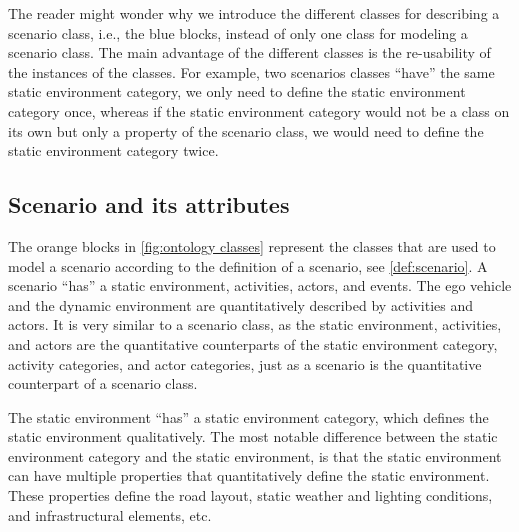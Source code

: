 \cbstart
The reader might wonder why we introduce the different classes for describing a scenario class, i.e., the blue blocks, instead of only one class for modeling a scenario class. 
The main advantage of the different classes is the re-usability of the instances of the classes. For example, two scenarios classes ``have'' the same static environment category, we only need to define the static environment category once, whereas if the static environment category would not be a class on its own but only a property of the scenario class, we would need to define the static environment category twice.
\cbend


\subsection{Scenario and its attributes}
\label{sec:domain scenario}

The orange blocks in \cref{fig:ontology classes} represent the classes that are used to model a scenario according to the definition of a scenario, see \cref{def:scenario}. A scenario ``has'' a static environment, activities, actors, and events. 
\cbstartb
The ego vehicle and the dynamic environment are quantitatively described by activities and actors. 
\cbend
It is very similar to a scenario class, as the static environment, activities, and actors are the quantitative counterparts of the static environment category, activity categories, and actor categories, just as a scenario is the quantitative counterpart of a scenario class. 

The static environment ``has'' a static environment category, which defines the static environment qualitatively. The most notable difference between the static environment category and the static environment, is that the static environment can have multiple properties that quantitatively define the static environment. These properties define the road layout, static weather and lighting conditions, and infrastructural elements, etc.

